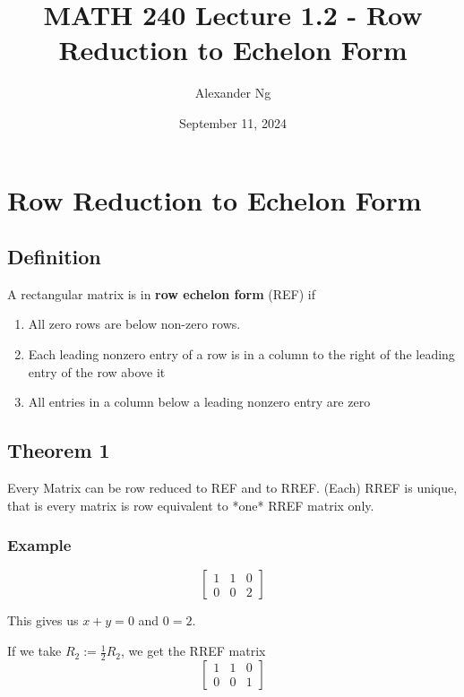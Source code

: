 \documentclass[12pt]{article}
\begin{document}
\title{MATH 240 Lecture 1.2 - Row Reduction to Echelon Form}
\author{Alexander Ng}
\date{September 11, 2024}

\maketitle

\section{Row Reduction to Echelon Form}

\subsection{Definition}
A rectangular matrix is in \textbf{row echelon form} (REF) if

\begin{enumerate}
  \item All zero rows are below non-zero rows.
  \item Each leading nonzero entry of a row is in a column to the right of the
  leading entry of the row above it
  \item All entries in a column below a leading nonzero entry are zero
\end{enumerate}

\subsection{Theorem 1}

Every Matrix can be row reduced to REF and to RREF.
(Each) RREF is unique, that is every matrix is row equivalent to *one*
RREF matrix only.

\subsubsection{Example}

\[
  \begin{bmatrix}
    1 & 1 & 0 \\
    0 & 0 & 2
  \end{bmatrix} 
\] 

This gives us $x+y = 0$ and $0=2$.

If we take $ R_2 := \frac{1}{2} R_2$, we get the RREF matrix
\[
  \begin{bmatrix}
    1 & 1 & 0 \\
    0 & 0 & 1
  \end{bmatrix}
\]
\end{document}
